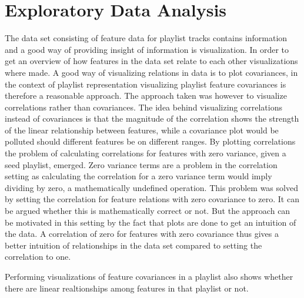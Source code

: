 \documentclass[a4paper,11pt]{kth-mag}
\begin{document}
\section{Exploratory Data Analysis}
The data set consisting of feature data for playlist tracks contains information and a good way of providing insight of information is visualization. In order to get an overview of how features in the data set relate to each other visualizations where made. A good way of visualizing relations in data is to plot covariances, in the context of playlist representation visualizing playlist feature covariances is therefore a reasonable approach. The approach taken was however to visualize correlations rather than covariances. The idea behind visualizing correlations instead of covariances is that the magnitude of the correlation shows the strength of the linear relationship between features, while a covariance plot would be polluted should different features be on different ranges. By plotting correlations the problem of calculating correlations for features with zero variance, given a seed playlist, emerged. Zero variance terms are a problem in the correlation setting as calculating the correlation for a zero variance term would imply dividing by zero, a mathematically undefined operation. This problem was solved by setting the correlation for feature relations with zero covariance to zero. It can be argued whether this is mathematically correct or not. But the approach can be motivated in this setting by the fact that plots are done to get an intuition of the data. A correlation of zero for features with zero covariance thus gives a better intuition of relationships in the data set compared to setting the correlation to one.

Performing visualizations of feature covariances in a playlist also shows whether there are linear realtionships among features in that playlist or not.
\end{document}
